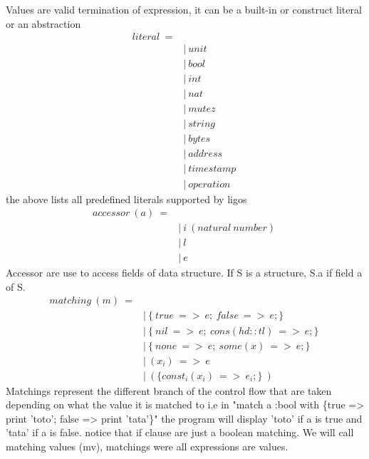 \documentclass[10pt,a4paper]{article}
\begin{document}
Values are valid termination of expression, it can be a built-in or construct literal or an abstraction
\begin{align*}
literal\ =
\\
 \ &|\ unit                            \ \tag{}
\\
 \ &|\ bool                            \ \tag{}
\\
 \ &|\ int                             \ \tag{}
\\
 \ &|\ nat                             \ \tag{}
\\
 \ &|\ mutez                           \ \tag{}
\\
 \ &|\ string                          \ \tag{}
\\
 \ &|\ bytes                           \ \tag{}
\\
 \ &|\ address                         \ \tag{}
\\
 \ &|\ timestamp                       \ \tag{}
\\
 \ &|\ operation                       \ \tag{}
\end{align*}
the above lists all predefined literals supported by ligos
\begin{align*}
accessor\ (a)\ = 
\\
 \ &|\ i\ (natural\ number)              \ \tag{for\ tuples}
\\
 \ &|\ l                               \ \tag{for\ record}
\\
 \ &|\ e                               \ \tag{for\ map}
\end{align*}
Accessor are use to access fields of data structure. If S is a structure, S.a if field a of S. 
\begin{align*}
matching\ (m)\ = 
\\
 \ &|\ \{\ true\ =>\ e;\ false\ =>\ e;\}       \ \tag{match\ bool}
\\
 \ &|\ \{\ nil \ =>\ e;\ cons(hd::tl)\ =>\ e;\}\ \tag{match\ list}
\\
 \ &|\ \{\ none\ =>\ e;\ some(x) \ =>\ e;\}    \ \tag{match\ option}
\\
 \ &|\ (x_i) \ =>\ e                     \ \tag{match\ tuple}
\\
 \ &|\ (\{const_i(x_i)\ =>\ e_i;\}\ )       \ \tag{match\ variant}
\end{align*}
Matchings represent the different branch of the control flow that are taken depending on what the value 
it is matched to i.e in "match a :bool with \{true => print 'toto'; false => print 'tata'\}" the program 
will display 'toto' if a is true and 'tata' if a is false. notice that if clause are just a boolean matching.
We will call matching values (mv), matchings were all expressions are values.
\end{document}
